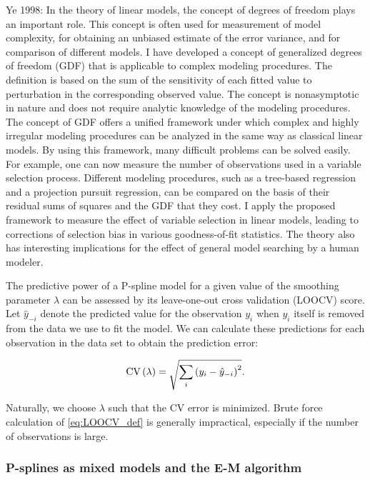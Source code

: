 \documentclass[12pt]{article}
\theoremstyle{definition}
\begin{document}
Ye 1998: In the theory of linear models, the concept of degrees of freedom plays an important role. This concept is often used for measurement
of model complexity, for obtaining an unbiased estimate of the error variance, and for comparison of different models.
I have developed a concept of generalized degrees of freedom (GDF) that is applicable to complex modeling procedures. The
definition is based on the sum of the sensitivity of each fitted value to perturbation in the corresponding observed value. The
concept is nonasymptotic in nature and does not require analytic knowledge of the modeling procedures. The concept of GDF
offers a unified framework under which complex and highly irregular modeling procedures can be analyzed in the same way as
classical linear models. By using this framework, many difficult problems can be solved easily. For example, one can now measure
the number of observations used in a variable selection process. Different modeling procedures, such as a tree-based regression
and a projection pursuit regression, can be compared on the basis of their residual sums of squares and the GDF that they cost.
I apply the proposed framework to measure the effect of variable selection in linear models, leading to corrections of selection
bias in various goodness-of-fit statistics. The theory also has interesting implications for the effect of general model searching by
a human modeler. 


The predictive power of a P-spline model for a given value of the smoothing parameter $\lambda$ can be assessed by its leave-one-out cross validation (LOOCV) score. Let $\hat{y}_{-i}$ denote the predicted value for the observation $y_i$ when $y_i$ itself is removed from the data we use to fit the model. We can calculate these predictions for each observation in the data set to obtain the prediction error:

\begin{equation} \label{eq:LOOCV_def}
\textup{CV}\left(\lambda\right) = \sqrt{\sum_i \left(y_i - \hat{y}_{-i}\right)^2}.
\end{equation}

Naturally, we choose $\lambda$ such that the CV error is minimized. Brute force calculation of \ref{eq:LOOCV_def} is generally impractical, especially if the number of observations is large.


\subsubsection{P-splines as mixed models and the E-M algorithm}
\end{document}
